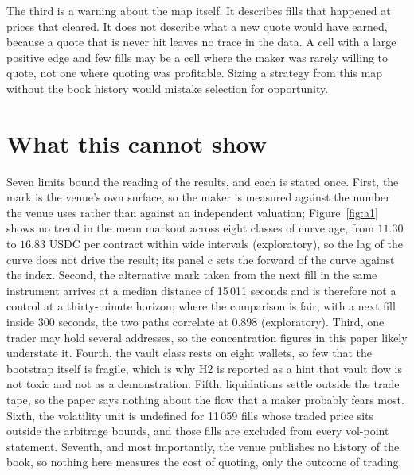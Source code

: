 \documentclass[a4paper,fleqn]{cas-dc}
\begin{document}
The third is a warning about the map itself. It describes fills that happened at prices that cleared. It
does not describe what a new quote would have earned, because a quote that is never hit leaves no trace in
the data. A cell with a large positive edge and few fills may be a cell where the maker was rarely willing
to quote, not one where quoting was profitable. Sizing a strategy from this map without the book history
would mistake selection for opportunity.

\section{What this cannot show}\label{sec:limits}
Seven limits bound the reading of the results, and each is stated once. First, the mark is the venue's own
surface, so the maker is measured against the number the venue uses rather than against an independent
valuation; Figure~\ref{fig:a1} shows no trend in the mean markout across eight classes of curve age, from
$11.30$ to $16.83$ USDC per contract within wide intervals (exploratory), so the lag of the curve does not
drive the result; its panel c sets the forward of the curve against the index. Second, the alternative mark
taken from the next fill in the same instrument arrives at a median distance of 15\,011 seconds and is
therefore not a control at a thirty-minute horizon; where the comparison is fair, with a next fill inside
300 seconds, the two paths correlate at $0.898$ (exploratory). Third, one trader may hold several addresses, so
the concentration figures in this paper likely understate it. Fourth, the vault class rests on eight wallets,
so few that the bootstrap itself is fragile, which is why H2 is reported as a hint that vault flow is not
toxic and not as a demonstration. Fifth,
liquidations settle outside the trade tape, so the paper says nothing about the flow that a maker probably
fears most. Sixth, the volatility unit is undefined for 11\,059 fills whose traded price sits outside the
arbitrage bounds, and those fills are excluded from every vol-point statement. Seventh, and most
importantly, the venue publishes no history of the book, so nothing here measures the cost of quoting, only
the outcome of trading.
\end{document}
